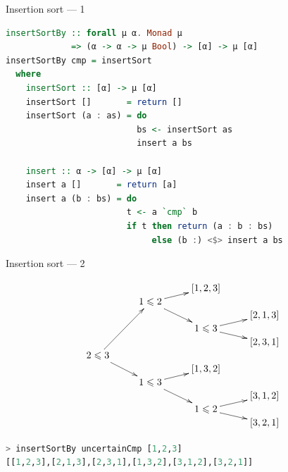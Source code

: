 \documentclass[handout]{beamer}
\def\le{\leqslant}
\begin{document}
\begin{frame}[fragile]{Insertion sort --- 1}

\begin{lstlisting}[language=Haskell]
insertSortBy :: forall μ α. Monad μ
             => (α -> α -> μ Bool) -> [α] -> μ [α]
insertSortBy cmp = insertSort
  where
    insertSort :: [α] -> μ [α]
    insertSort []       = return []
    insertSort (a : as) = do
                          bs <- insertSort as
                          insert a bs

    insert :: α -> [α] -> μ [α]
    insert a []       = return [a]
    insert a (b : bs) = do
                        t <- a `cmp` b
                        if t then return (a : b : bs)
                             else (b :) <$> insert a bs
\end{lstlisting}

\end{frame}

\begin{frame}[fragile]{Insertion sort --- 2}

$$\xymatrix@R-2.1pc{
                           &                         & [1,2,3]                &         \\
                           & 1 \le 2 \ar[ur]\ar[ddr] &                        &         \\
                           &                         &                        & [2,1,3] \\
                           &                         & 1 \le 3 \ar[ur]\ar[dr] &         \\
                           &                         &                        & [2,3,1] \\
2 \le 3 \ar[uuuur]\ar[ddr] &                         &                        &         \\
                           &                         & [1,3,2]                &         \\
                           & 1 \le 3 \ar[ur]\ar[ddr] &                        &         \\
                           &                         &                        & [3,1,2] \\
                           &                         & 1 \le 2 \ar[ur]\ar[dr] &         \\
                           &                         &                        & [3,2,1] \\
}$$

\begin{lstlisting}[language=Haskell]
> insertSortBy uncertainCmp [1,2,3]
[[1,2,3],[2,1,3],[2,3,1],[1,3,2],[3,1,2],[3,2,1]]
\end{lstlisting}

\end{frame}
\end{document}
